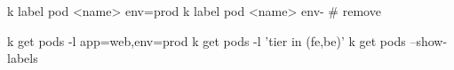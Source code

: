 

\begin{cheatcodebashbold}
k label pod <name> env=prod
k label pod <name> env- # remove
\end{cheatcodebashbold}

\begin{cheatcodebashbold}
k get pods -l app=web,env=prod
k get pods -l 'tier in (fe,be)'
k get pods --show-labels
\end{cheatcodebashbold}

